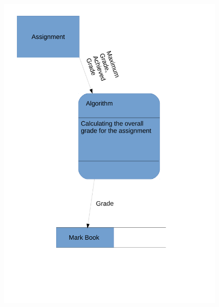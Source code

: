 \begin{algorithm}[H]
\begin{figure}[H]
    \includegraphics[width=\textwidth]{./Analysis/images/DataFlowDiagrams.pdf}
\end{figure}


\end{algorithm}
